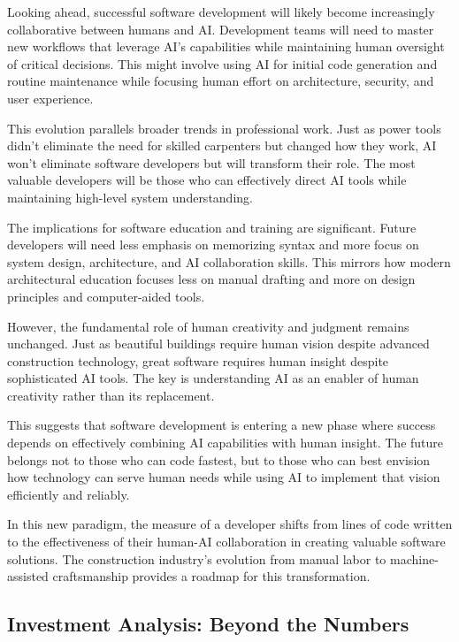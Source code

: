 \documentclass[
  Letterpaper,
]{scrbook}
\begin{document}
Looking ahead, successful software development will likely become
increasingly collaborative between humans and AI. Development teams will
need to master new workflows that leverage AI's capabilities while
maintaining human oversight of critical decisions. This might involve
using AI for initial code generation and routine maintenance while
focusing human effort on architecture, security, and user experience.

This evolution parallels broader trends in professional work. Just as
power tools didn't eliminate the need for skilled carpenters but changed
how they work, AI won't eliminate software developers but will transform
their role. The most valuable developers will be those who can
effectively direct AI tools while maintaining high-level system
understanding.

The implications for software education and training are significant.
Future developers will need less emphasis on memorizing syntax and more
focus on system design, architecture, and AI collaboration skills. This
mirrors how modern architectural education focuses less on manual
drafting and more on design principles and computer-aided tools.

However, the fundamental role of human creativity and judgment remains
unchanged. Just as beautiful buildings require human vision despite
advanced construction technology, great software requires human insight
despite sophisticated AI tools. The key is understanding AI as an
enabler of human creativity rather than its replacement.

This suggests that software development is entering a new phase where
success depends on effectively combining AI capabilities with human
insight. The future belongs not to those who can code fastest, but to
those who can best envision how technology can serve human needs while
using AI to implement that vision efficiently and reliably.

In this new paradigm, the measure of a developer shifts from lines of
code written to the effectiveness of their human-AI collaboration in
creating valuable software solutions. The construction industry's
evolution from manual labor to machine-assisted craftsmanship provides a
roadmap for this transformation.

\subsection{Investment Analysis: Beyond the
Numbers}\label{investment-analysis-beyond-the-numbers}
\end{document}
